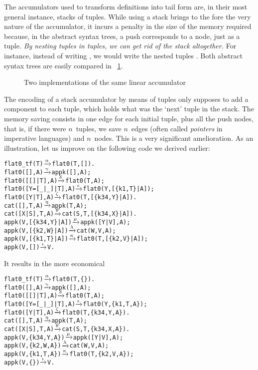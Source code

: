 The accumulators used to transform definitions into tail form are, in
their most general instance, stacks of tuples. While using a stack
brings to the fore the very nature of the accumulator, it incurs a
penalty in the size of the memory required because, in the abstract
syntax trees, a push corresponds to a node, just as a tuple. \emph{By
  nesting tuples in tuples, we can get rid of the stack altogether.}
For instance, instead of writing
\erlcode{[\{k3,\(X_1\)\},\{k1,\(V\),\(E\)\},\{k3,\(X_2\)\}]}, we would
write the nested tuples
. Both
abstract syntax trees are easily compared in
\fig~\ref{fig:tuple_vs_stack}.
\begin{figure}
\centering
{}
\caption{Two implementations of the same linear accumulator}
\label{fig:tuple_vs_stack}
\end{figure}
The encoding of a stack accumulator by means of tuples only supposes
to add a component to each tuple, which holds what was the `next'
tuple in the stack. The memory saving consists in one edge for each
initial tuple, plus all the push nodes, that is, if there were
\(n\)~tuples, we save \(n\)~edges (often called \emph{pointers} in
imperative languages) and \(n\)~nodes. This is a very significant
amelioration. As an illustration, let us improve on the following code
we derived earlier: 
\begin{alltt}
flat0\_tf(T)          \(\smashedrightarrow{\alpha}\) flat0(T,[]).
flat0(         [],A) \(\smashedrightarrow{\gamma}\) appk([],A);
flat0(     [[]|T],A) \(\smashedrightarrow{\delta}\) flat0(T,A);
flat0([Y=[\_|\_]|T],A) \(\smashedrightarrow{\epsilon}\) flat0(Y,[\{k1,T\}|A]);
flat0(    [Y|T],A)   \(\smashedrightarrow{\zeta}\) flat0(T,[\{k34,Y\}|A]).
cat(   [],T,A)       \(\smashedrightarrow{\eta}\) appk(T,A);
cat([X|S],T,A)       \(\smashedrightarrow{\theta}\) cat(S,T,[\{k34,X\}|A]).
appk(V,[\{k34,Y\}|A])  \(\smashedrightarrow{\mu}\) appk([Y|V],A);
appk(V, [\{k2,W\}|A])  \(\smashedrightarrow{\lambda}\) cat(W,V,A);
appk(V, [\{k1,T\}|A])  \(\smashedrightarrow{\kappa}\) flat0(T,[\{k2,V\}|A]);
appk(V,         [])  \(\smashedrightarrow{\iota}\) V.
\end{alltt}
It results in the more economical
\begin{alltt}
flat0\_tf(T)          \(\smashedrightarrow{\alpha}\) flat0(T,\{\}).
flat0(         [],A) \(\smashedrightarrow{\gamma}\) appk([],A);
flat0(     [[]|T],A) \(\smashedrightarrow{\delta}\) flat0(T,A);
flat0([Y=[\_|\_]|T],A) \(\smashedrightarrow{\epsilon}\) flat0(Y,\{k1,T,A\});
flat0(      [Y|T],A) \(\smashedrightarrow{\zeta}\) flat0(T,\{k34,Y,A\}).
cat(   [],T,A)       \(\smashedrightarrow{\eta}\) appk(T,A);
cat([X|S],T,A)       \(\smashedrightarrow{\theta}\) cat(S,T,\{k34,X,A\}).
appk(V,\{k34,Y,A\})    \(\smashedrightarrow{\mu}\) appk([Y|V],A);
appk(V, \{k2,W,A\})    \(\smashedrightarrow{\lambda}\) cat(W,V,A);
appk(V, \{k1,T,A\})    \(\smashedrightarrow{\kappa}\) flat0(T,\{k2,V,A\});
appk(V,       \{\})    \(\smashedrightarrow{\iota}\) V.
\end{alltt}
